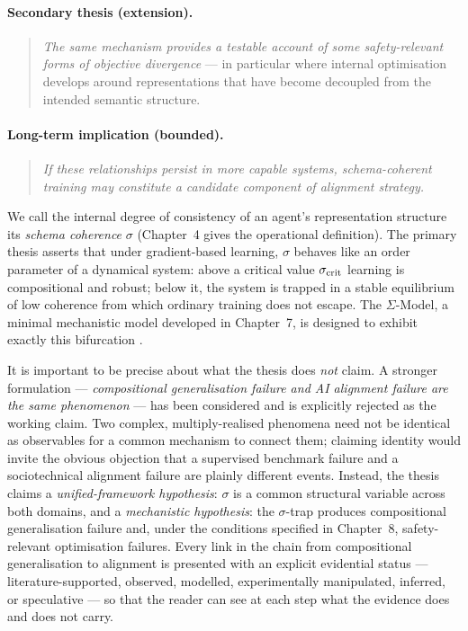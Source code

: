 \paragraph{Secondary thesis (extension).}
\begin{quote}
\emph{The same mechanism provides a testable account of some safety-relevant forms of
objective divergence} --- in particular where internal optimisation develops around
representations that have become decoupled from the intended semantic structure.
\end{quote}

\paragraph{Long-term implication (bounded).}
\begin{quote}
\emph{If these relationships persist in more capable systems, schema-coherent training
may constitute a candidate component of alignment strategy.}
\end{quote}

We call the internal degree of consistency of an agent's representation structure its
\emph{schema coherence} $\sigma$ (Chapter~4 gives the operational definition). The
primary thesis asserts that under gradient-based learning, $\sigma$ behaves like an
order parameter of a dynamical system: above a critical value $\sigma_{\mathrm{crit}}$ learning is
compositional and robust; below it, the system is trapped in a stable equilibrium of
low coherence from which ordinary training does not escape. The $\Sigma$-Model, a
minimal mechanistic model developed in Chapter~7, is designed to exhibit exactly this
bifurcation \citep{amsyar2026sigma}.

It is important to be precise about what the thesis does \emph{not} claim. A stronger
formulation --- \emph{compositional generalisation failure and AI alignment failure are
the same phenomenon} --- has been considered and is explicitly rejected as the working
claim. Two complex, multiply-realised phenomena need not be identical as observables
for a common mechanism to connect them; claiming identity would invite the obvious
objection that a supervised benchmark failure and a sociotechnical alignment failure
are plainly different events. Instead, the thesis claims a \emph{unified-framework
hypothesis}: $\sigma$ is a common structural variable across both domains, and a
\emph{mechanistic hypothesis}: the $\sigma$-trap produces compositional generalisation
failure and, under the conditions specified in Chapter~8, safety-relevant optimisation
failures. Every link in the chain from compositional generalisation to alignment is
presented with an explicit evidential status --- literature-supported, observed,
modelled, experimentally manipulated, inferred, or speculative --- so that the reader
can see at each step what the evidence does and does not carry.

